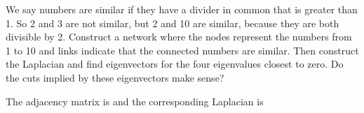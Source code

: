 We say numbers are similar if they have a divider in common that is greater than 1. So 2 and 3 are not similar, but 2 and 10 are similar, because they are both divisible by 2. Construct a network where the nodes represent the numbers from 1 to 10 and links indicate that the connected numbers are similar. Then construct the Laplacian and find eigenvectors for the four eigenvalues closest to zero. Do the cuts implied by these eigenvectors make sense? 

\solution 
The adjacency matrix is 
and the corresponding Laplacian is 
